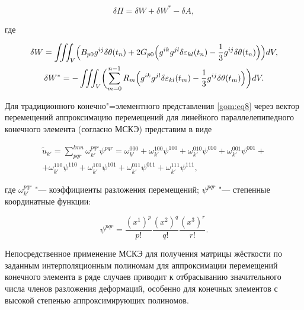 \begin{equation}

\delta \Pi=\delta W+\delta W^{*}-\delta A, 

\label{gom:eq8}

\end{equation}

где

\begin{gather}

\delta W=\iiint_{V}\Bigl(B_{p0}g^{ij}\delta\theta(t_{n})+2G_{p0}\Bigl(g^{ik}g^{jl}\delta\varepsilon_{kl}(t_{n})-

\frac{1}{3}g^{ij}\delta\theta(t_{n})\Bigr)\Bigr) dV,\\

\delta W^{*}=-\iiint_{V}\biggl(\sum_{m=0}^{n-1}R_{m}\Bigl(g^{ik}g^{jl}\delta\varepsilon_{kl}(t_{m})-

\frac{1}{3}g^{ij}\delta\theta(t_{m})\Bigr)\biggr)dV.

\end{gather}



Для традиционного конечно"=элементного представления \eqref{gom:eq8} через вектор перемещений аппроксимацию перемещений для линейного параллелепипедного конечного элемента (согласно МСКЭ) представим в виде

\begin{multline}

\label{gom:eq9}

\widetilde{u}_{k'}=\sum_{pqr}^{lmn} \omega_{k'}^{pqr}\psi^{pqr} = \omega_{k'}^{000}+

\omega_{k'}^{100}\psi^{100}+ \omega_{k'}^{010}\psi^{010}+\omega_{k'}^{001}\psi^{001}+ \\

+\omega_{k'}^{110}\psi^{110}+ \omega_{k'}^{101}\psi^{101} +\omega_{k'}^{011}\psi^{011}+\omega_{k'}^{111}\psi^{111}, 

\end{multline}

где $\omega_{k'}^{pqr}$ "--- коэффициенты разложения перемещений; $\psi^{pqr}$ "--- степенные координатные функции:

$$\psi^{pqr}=\frac{(x^1)^p}{p!}\frac{(x^2)^q}{q!}\frac{(x^3)^r}{r!}.$$



Непосредственное применение МСКЭ для получения матрицы жёсткости по заданным интерполяционным полиномам для аппроксимации перемещений конечного элемента в ряде случаев приводит к отбрасыванию значительного числа членов разложения деформаций, особенно для конечных элементов с высокой степенью аппроксимирующих полиномов.



